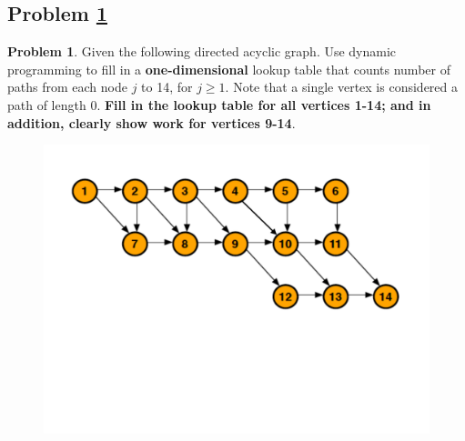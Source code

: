 \documentclass[11pt]{article}
\theoremstyle{definition}
\theoremstyle{definition}
\newtheorem{required}{Problem}
\theoremstyle{definition}
\begin{document}
\subsection{Problem \ref{Recurrence1}}
\begin{required} \label{Recurrence1}
Given the following directed acyclic graph. Use dynamic programming to fill in a \textbf{one-dimensional} lookup table that counts number of paths from each node $j$ to 14, for $j \geq 1$. Note that a single vertex is considered a path of length $0$. \textbf{Fill in the lookup table for all vertices 1-14; and in addition, clearly show work for vertices 9-14}.

        \begin{figure}[h!]
        \begin{center}
        \includegraphics[scale=0.45]{dag_ps10.pdf} 
        \end{center}
        \end{figure}

\end{required}
\end{document}
